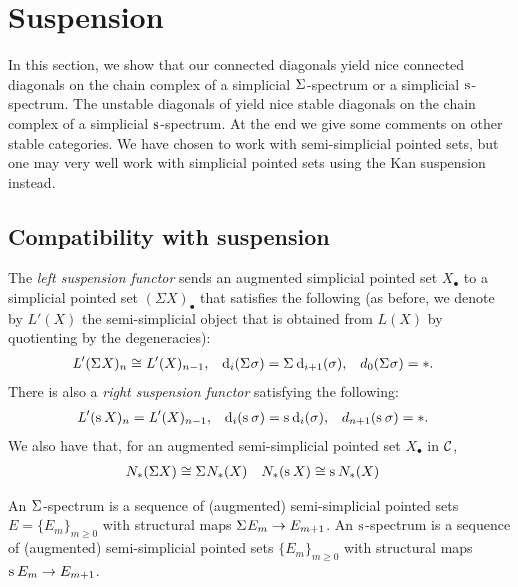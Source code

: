 
\section{Suspension}\label{s:suspension}


In this section, we show that our connected diagonals yield nice connected diagonals on the chain complex of a simplicial $\Sigma^{}$-spectrum or a simplicial $\operatorname{s}^{}$-spectrum. The unstable diagonals of \cite{medina2021may_st} yield nice stable diagonals on the chain complex of a simplicial $\operatorname{s}^{}$-spectrum. At the end we give some comments on other stable categories. We have chosen to work with semi-simplicial pointed sets, but one may very well work with simplicial pointed sets using the Kan suspension instead.


\subsection{Compatibility with suspension} The \emph{left suspension functor} sends an augmented simplicial pointed set $X_\bullet$ to a simplicial pointed set $(\Sigma X)_\bullet$ that satisfies the following (as before, we denote by $L'(X)$ the semi-simplicial object that is obtained from $L(X)$ by quotienting by the degeneracies):
\begin{align*}
 \operatorname{{\it L}}'(\Sigma^{} X)_n &\cong \operatorname{{\it L}}'(X)_{n-1},& \operatorname{d}_i(\Sigma^{}\sigma) &= \Sigma^{} \operatorname{d}_{i+1}(\sigma),& d_{0}(\Sigma^{}\sigma) &= *.
\end{align*}
There is also a \emph{right suspension functor} satisfying the following:
\begin{align*}
 \operatorname{{\it L}}'(\operatorname{s}^{} X)_n &= \operatorname{{\it L}}'(X)_{n-1}, &\operatorname{d}_i(\operatorname{s}^{}\sigma) &= \operatorname{s}^{} \operatorname{d}_i(\sigma),& d_{n+1}(\operatorname{s}^{} \sigma) &= *.
\end{align*}
We also have that, for an augmented semi-simplicial pointed set $X_\bullet$ in $\mathcal{C}$,
\begin{align*}
 N_{*}(\Sigma X)&\cong \Sigma^{} N_{*}(X) & N_{*}(\operatorname{s}^{}X) &\cong \operatorname{s}^{}N_{*}(X)
\end{align*}

An $\Sigma^{}$-spectrum is a sequence of (augmented) semi-simplicial pointed sets $E = \{E_m\}_{m \geq 0}$ with structural maps $\Sigma^{} E_m \to E_{m+1}$. An $\operatorname{s}^{}$-spectrum is a sequence of (augmented) semi-simplicial pointed sets $\{E_m\}_{m \geq 0}$ with structural maps $\operatorname{s}^{} E_m \to E_{m+1}$.

